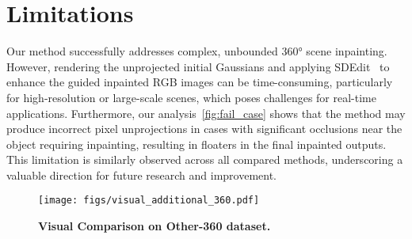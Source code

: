 \section{Limitations}
\label{sec:limitations}
Our method successfully addresses complex, unbounded 360° scene inpainting. However, rendering the unprojected initial Gaussians and applying SDEdit~\cite{meng2022sdedit} to enhance the guided inpainted RGB images can be time-consuming, particularly for high-resolution or large-scale scenes, which poses challenges for real-time applications. Furthermore, our analysis~\cref{fig:fail_case} shows that the method may produce incorrect pixel unprojections in cases with significant occlusions near the object requiring inpainting, resulting in floaters in the final inpainted outputs. This limitation is similarly observed across all compared methods, underscoring a valuable direction for future research and improvement.




\begin{figure*}[t]
    \centering
    \texttt{[image: figs/visual\_additional\_360.pdf]}
    \caption{\textbf{Visual Comparison on Other-360 dataset.} }
    \label{fig:visual_add_360}
\end{figure*}





